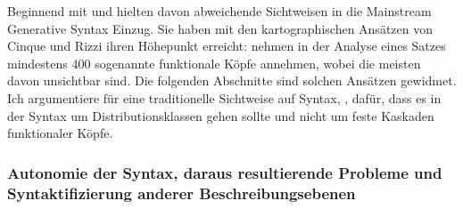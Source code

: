 {}%
Beginnend mit \citet{Larson88a} und \citet{Pollock89a-u} hielten davon abweichende Sichtweisen in die Mainstream
Generative Syntax Einzug. Sie haben mit den kartographischen Ansätzen von Cinque und Rizzi ihren
Höhepunkt erreicht: \citet[57]{CR2010a} nehmen in der Analyse eines Satzes mindestens
400 sogenannte funktionale Köpfe annehmen, wobei die meisten davon unsichtbar sind. Die folgenden
Abschnitte sind solchen Ansätzen gewidmet. Ich argumentiere für eine traditionelle Sichtweise
auf Syntax, \dash, dafür, dass es in der Syntax um Distributionsklassen gehen sollte und nicht um
feste Kaskaden funktionaler Köpfe. 

\subsubsection{Autonomie der Syntax, daraus resultierende Probleme und Syntaktifizierung anderer Beschreibungsebenen}
\label{sec-autonomy-of-syntax}

